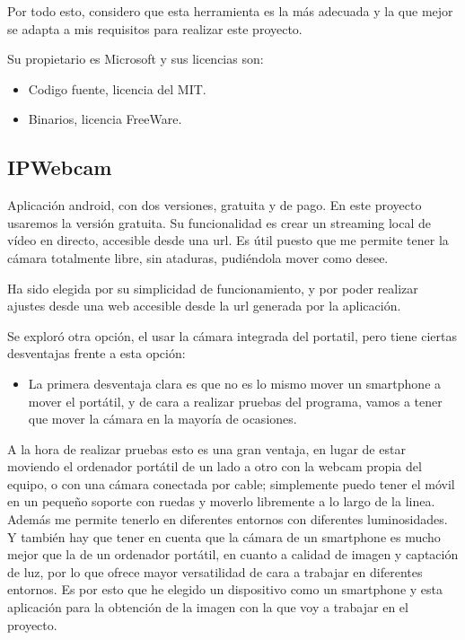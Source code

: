 Por todo esto, considero que esta herramienta es la más adecuada y la que mejor se adapta a mis requisitos para realizar este proyecto.

Su propietario es Microsoft y sus licencias son:
\begin{itemize}
	\item Codigo fuente, licencia del MIT.
	\item Binarios, licencia FreeWare.
\end{itemize}

\subsection{IPWebcam}
Aplicación android, con dos versiones, gratuita y de pago. En este proyecto usaremos la versión gratuita.
Su funcionalidad es crear un streaming local de vídeo en directo, accesible desde una url. Es útil puesto que me permite tener la cámara totalmente libre, sin ataduras, pudiéndola mover como desee.

Ha sido elegida por su simplicidad de funcionamiento, y por poder realizar ajustes desde una web accesible desde la url generada por la aplicación.

Se exploró otra opción, el usar la cámara integrada del portatil, pero tiene ciertas desventajas frente a esta opción:

\begin{itemize}
	
	\item La primera desventaja clara es que no es lo mismo mover un smartphone a mover el portátil, y de cara a realizar pruebas del programa, vamos a tener que mover la cámara en la mayoría de ocasiones.
	
\end{itemize}

A la hora de realizar pruebas esto es una gran ventaja, en lugar de estar moviendo el ordenador portátil de un lado a otro con la webcam propia del equipo, o con una cámara conectada por cable; simplemente puedo tener el móvil en un pequeño soporte con ruedas y moverlo libremente a lo largo de la linea. Además me permite tenerlo en diferentes entornos con diferentes luminosidades. Y también hay que tener en cuenta que la cámara de un smartphone es mucho mejor que la de un ordenador portátil, en cuanto a calidad de imagen y captación de luz, por lo que ofrece mayor versatilidad de cara a trabajar en diferentes entornos. Es por esto que he elegido un dispositivo como un smartphone y esta aplicación para la obtención de la imagen con la que voy a trabajar en el proyecto.





 
